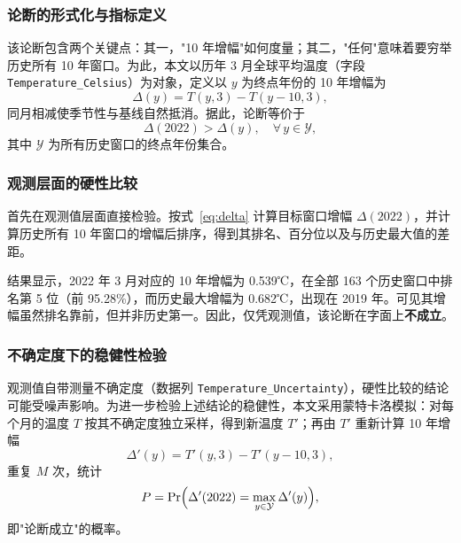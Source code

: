 \subsubsection{论断的形式化与指标定义}

该论断包含两个关键点：其一，"10 年增幅"如何度量；其二，"任何"意味着要穷举历史所有 10 年窗口。为此，本文以历年 3 月全球平均温度（字段 \texttt{Temperature\_Celsius}）为对象，定义以 $y$ 为终点年份的 10 年增幅为
\begin{equation}
  \Delta(y) = T(y,3) - T(y-10,3),
  \label{eq:delta}
\end{equation}
同月相减使季节性与基线自然抵消。据此，论断等价于
\begin{equation}
  \Delta(2022) > \Delta(y), \quad \forall\, y \in \mathcal{Y},
  \label{eq:claim}
\end{equation}
其中 $\mathcal{Y}$ 为所有历史窗口的终点年份集合。

\subsubsection{观测层面的硬性比较}

首先在观测值层面直接检验。按式~\eqref{eq:delta} 计算目标窗口增幅 $\Delta(2022)$，并计算历史所有 10 年窗口的增幅后排序，得到其排名、百分位以及与历史最大值的差距。

结果显示，2022 年 3 月对应的 10 年增幅为 0.539℃，在全部 163 个历史窗口中排名第 5 位（前 95.28\%），而历史最大增幅为 0.682℃，出现在 2019 年。可见其增幅虽然排名靠前，但并非历史第一。因此，仅凭观测值，该论断在字面上\textbf{不成立}。

\subsubsection{不确定度下的稳健性检验}

观测值自带测量不确定度（数据列 \texttt{Temperature\_Uncertainty}），硬性比较的结论可能受噪声影响。为进一步检验上述结论的稳健性，本文采用蒙特卡洛模拟：对每个月的温度 $T$ 按其不确定度独立采样，得到新温度 $T'$；再由 $T'$ 重新计算 10 年增幅
\begin{equation}
  \Delta'(y) = T'(y,3) - T'(y-10,3),
\end{equation}
重复 $M$ 次，统计
\begin{equation}
  P = \Pr\Bigl(\Delta'(2022) = \max_{y \in \mathcal{Y}} \Delta'(y)\Bigr),
  \label{eq:prob}
\end{equation}
即"论断成立"的概率。

